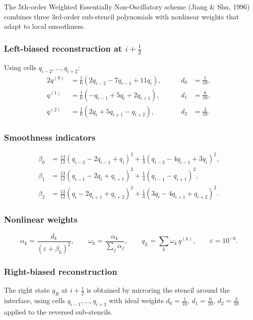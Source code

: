 \documentclass[11pt,a4paper]{article}
\newcommand{\half}{\tfrac{1}{2}}
\begin{document}
The 5th-order Weighted Essentially Non-Oscillatory scheme (Jiang \& Shu, 1996) combines three 3rd-order sub-stencil polynomials with nonlinear weights that adapt to local smoothness.

\subsubsection{Left-biased reconstruction at $i\!+\!\half$}
Using cells $q_{i-2},\ldots,q_{i+2}$:
\begin{alignat}{2}
  q^{(0)} &= \tfrac{1}{6}(2q_{i-2}-7q_{i-1}+11q_i),
  &\qquad d_0 &= \tfrac{1}{10},\\
  q^{(1)} &= \tfrac{1}{6}(-q_{i-1}+5q_i+2q_{i+1}),
  &\qquad d_1 &= \tfrac{6}{10},\\
  q^{(2)} &= \tfrac{1}{6}(2q_i+5q_{i+1}-q_{i+2}),
  &\qquad d_2 &= \tfrac{3}{10}.
\end{alignat}

\subsubsection{Smoothness indicators}
\begin{align}
  \beta_0 &= \tfrac{13}{12}(q_{i-2}-2q_{i-1}+q_i)^2 + \tfrac{1}{4}(q_{i-2}-4q_{i-1}+3q_i)^2,\\
  \beta_1 &= \tfrac{13}{12}(q_{i-1}-2q_i+q_{i+1})^2 + \tfrac{1}{4}(q_{i-1}-q_{i+1})^2,\\
  \beta_2 &= \tfrac{13}{12}(q_i-2q_{i+1}+q_{i+2})^2 + \tfrac{1}{4}(3q_i-4q_{i+1}+q_{i+2})^2.
\end{align}

\subsubsection{Nonlinear weights}
\begin{equation}
  \alpha_k = \frac{d_k}{(\varepsilon+\beta_k)^2}, \qquad
  \omega_k = \frac{\alpha_k}{\sum_j\alpha_j}, \qquad
  q_L = \sum_k \omega_k\,q^{(k)}, \qquad \varepsilon=10^{-6}.
\end{equation}

\subsubsection{Right-biased reconstruction}
The right state $q_R$ at $i\!+\!\half$ is obtained by mirroring the stencil around the interface, using cells $q_{i-1},\ldots,q_{i+3}$ with ideal weights $d_0=\tfrac{1}{10}$, $d_1=\tfrac{6}{10}$, $d_2=\tfrac{3}{10}$ applied to the reversed sub-stencils.
\end{document}
